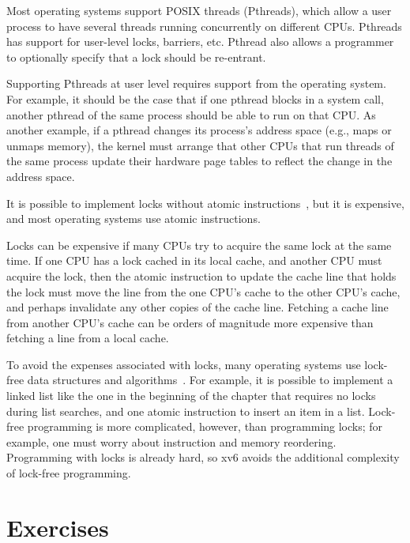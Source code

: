 Most operating systems support POSIX threads (Pthreads), which allow a
user process to have several threads running concurrently on different
CPUs.  Pthreads has support for user-level locks, barriers, etc.
Pthread also allows a programmer to optionally specify that a lock
should be re-entrant.

Supporting Pthreads at user level requires support from the operating
system. For example, it should be the case that if one pthread blocks
in a system call, another pthread of the same process should be able
to run on that CPU.  As another example, if a pthread changes its
process's address space (e.g., maps or unmaps memory), the kernel must
arrange that other CPUs that run threads of the same process update
their hardware page tables to reflect the change in the address space.

It is possible to implement locks without atomic
instructions~\cite{lamport:bakery}, but it is expensive, and most
operating systems use atomic instructions.

Locks can be expensive if many CPUs try to acquire the same lock
at the same time.  If one CPU has a lock
cached in its local cache, and another CPU must acquire the lock, then the
atomic instruction to update the cache line that holds the lock must move the line
from the one CPU's cache to the other CPU's cache, and perhaps
invalidate any other copies of the cache line.  Fetching a cache line from
another CPU's cache can be orders of magnitude more expensive than
fetching a line from a local cache.

To avoid the expenses associated with locks, many operating systems
use lock-free data structures and algorithms~\cite{herlihy:art,mckenney:rcuusage}.
For example, it is possible to implement a linked list like the one in
the beginning of the chapter that requires no locks during list
searches, and one atomic instruction to insert an item in a list.
Lock-free programming is more complicated, however, than programming
locks; for example, one must worry about instruction and memory
reordering.  Programming with locks is already hard, so xv6 avoids the
additional complexity of lock-free programming.

\section{Exercises}

